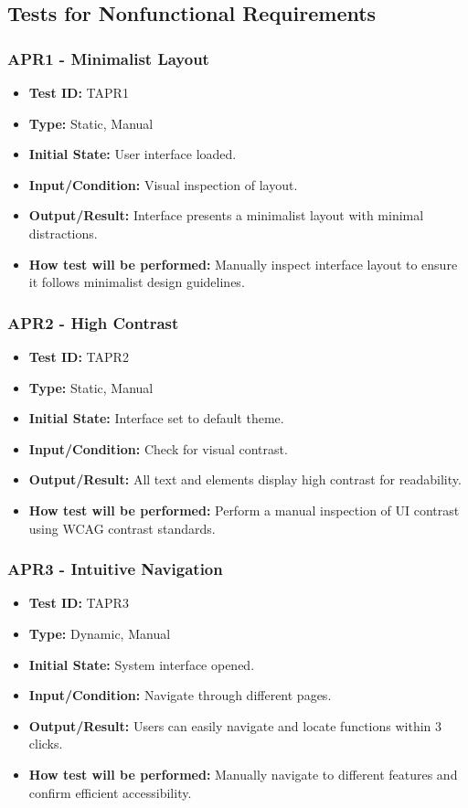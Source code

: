 \documentclass[12pt, titlepage]{article}
\begin{document}
\subsection{Tests for Nonfunctional Requirements}

\subsubsection{APR1 - Minimalist Layout}
\begin{itemize}
    \item \textbf{Test ID:} TAPR1
    \item \textbf{Type:} Static, Manual
    \item \textbf{Initial State:} User interface loaded.
    \item \textbf{Input/Condition:} Visual inspection of layout.
    \item \textbf{Output/Result:} Interface presents a minimalist layout with minimal distractions.
    \item \textbf{How test will be performed:} Manually inspect interface layout to ensure it follows minimalist design guidelines.
\end{itemize}

\subsubsection{APR2 - High Contrast}
\begin{itemize}
    \item \textbf{Test ID:} TAPR2
    \item \textbf{Type:} Static, Manual
    \item \textbf{Initial State:} Interface set to default theme.
    \item \textbf{Input/Condition:} Check for visual contrast.
    \item \textbf{Output/Result:} All text and elements display high contrast for readability.
    \item \textbf{How test will be performed:} Perform a manual inspection of UI contrast using WCAG contrast standards.
\end{itemize}

\subsubsection{APR3 - Intuitive Navigation}
\begin{itemize}
    \item \textbf{Test ID:} TAPR3
    \item \textbf{Type:} Dynamic, Manual
    \item \textbf{Initial State:} System interface opened.
    \item \textbf{Input/Condition:} Navigate through different pages.
    \item \textbf{Output/Result:} Users can easily navigate and locate functions within 3 clicks.
    \item \textbf{How test will be performed:} Manually navigate to different features and confirm efficient accessibility.
\end{itemize}
\end{document}
